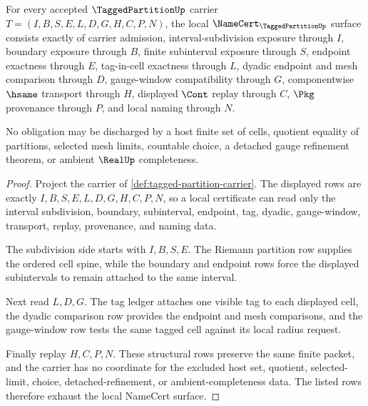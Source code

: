 \begin{theorem}
\label{thm:tagged-partition-namecert-obligations}
For every accepted $\TaggedPartitionUp$ carrier $T=(I,B,S,E,L,D,G,H,C,P,N)$, the local $\NameCert_{\TaggedPartitionUp}$ surface consists exactly of carrier admission, interval-subdivision exposure through $I$, boundary exposure through $B$, finite subinterval exposure through $S$, endpoint exactness through $E$, tag-in-cell exactness through $L$, dyadic endpoint and mesh comparison through $D$, gauge-window compatibility through $G$, componentwise $\hsame$ transport through $H$, displayed $\Cont$ replay through $C$, $\Pkg$ provenance through $P$, and local naming through $N$.

No obligation may be discharged by a host finite set of cells, quotient equality of partitions, selected mesh limits, countable choice, a detached gauge refinement theorem, or ambient $\RealUp$ completeness.
\end{theorem}
\begin{proof}
Project the carrier of \autoref{def:tagged-partition-carrier}. The displayed rows are exactly $I,B,S,E,L,D,G,H,C,P,N$, so a local certificate can read only the interval subdivision, boundary, subinterval, endpoint, tag, dyadic, gauge-window, transport, replay, provenance, and naming data.

The subdivision side starts with $I,B,S,E$. The Riemann partition row supplies the ordered cell spine, while the boundary and endpoint rows force the displayed subintervals to remain attached to the same interval.

Next read $L,D,G$. The tag ledger attaches one visible tag to each displayed cell, the dyadic comparison row provides the endpoint and mesh comparisons, and the gauge-window row tests the same tagged cell against its local radius request.

Finally replay $H,C,P,N$. These structural rows preserve the same finite packet, and the carrier has no coordinate for the excluded host set, quotient, selected-limit, choice, detached-refinement, or ambient-completeness data. The listed rows therefore exhaust the local NameCert surface.
\end{proof}

